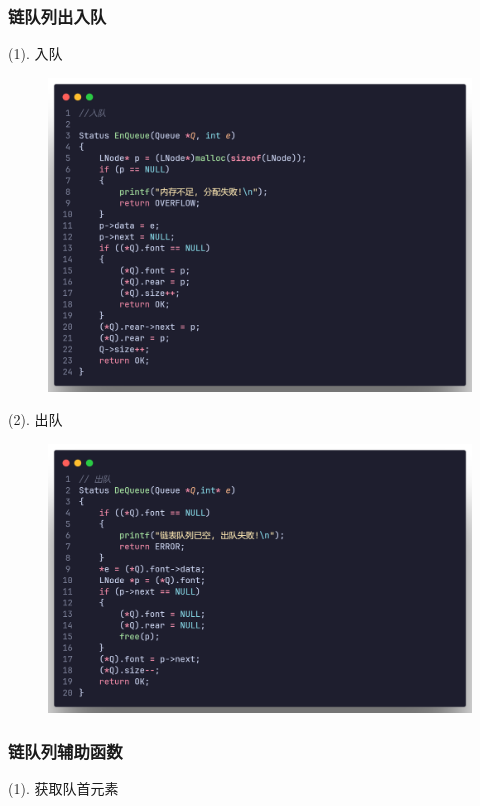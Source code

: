 \subsubsection{链队列出入队}

(1). 入队

\begin{figure}[H]
    \centering
    \includegraphics[scale=0.2]{"figure/Note/Stack/QlEq.png"}
\end{figure}

(2). 出队

\begin{figure}[H]
    \centering
    \includegraphics[scale=0.2]{"figure/Note/Stack/QlDq.png"}
\end{figure}

\subsubsection{链队列辅助函数}
(1). 获取队首元素

